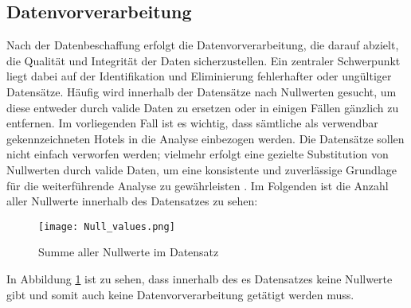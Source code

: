 \subsection{Datenvorverarbeitung}
\label{subsec:Datenvorverarbeitung}
Nach der Datenbeschaffung erfolgt die Datenvorverarbeitung, die darauf abzielt, die Qualität und Integrität der Daten sicherzustellen. Ein zentraler Schwerpunkt liegt dabei auf der Identifikation und Eliminierung fehlerhafter oder ungültiger Datensätze. Häufig wird innerhalb der Datensätze nach Nullwerten gesucht, um diese entweder durch valide Daten zu ersetzen oder in einigen Fällen gänzlich zu entfernen. Im vorliegenden Fall ist es wichtig, dass sämtliche als verwendbar gekennzeichneten Hotels in die Analyse einbezogen werden. Die Datensätze sollen nicht einfach verworfen werden; vielmehr erfolgt eine gezielte Substitution von Nullwerten durch valide Daten, um eine konsistente und zuverlässige Grundlage für die weiterführende Analyse zu gewährleisten \cite{Agarwal.05.10.2018}.
\newline
\newline
Im Folgenden ist die Anzahl aller Nullwerte innerhalb des Datensatzes zu sehen:
\begin{figure}[h]
    \centering
    \texttt{[image: Null\_values.png]}
    \caption[Summe aller Nullwerte im Datensatz]{Summe aller Nullwerte im Datensatz}
    \label{img:null_values}
\end{figure}

In Abbildung \ref{img:null_values} ist zu sehen, dass innerhalb des es Datensatzes keine Nullwerte gibt und somit auch keine Datenvorverarbeitung getätigt werden muss.